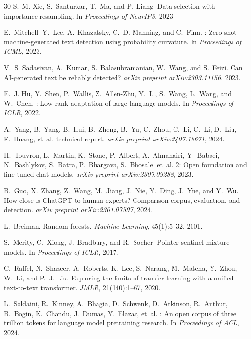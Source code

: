 \documentclass[11pt,a4paper]{article}
\begin{document}
\begin{thebibliography}{30}
S.~M. Xie, S.~Santurkar, T.~Ma, and P.~Liang.
\newblock Data selection with importance resampling.
\newblock In \emph{Proceedings of NeurIPS}, 2023.

E.~Mitchell, Y.~Lee, A.~Khazatsky, C.~D. Manning, and C.~Finn.
: Zero-shot machine-generated text detection using probability curvature.
\newblock In \emph{Proceedings of ICML}, 2023.

V.~S. Sadasivan, A.~Kumar, S.~Balasubramanian, W.~Wang, and S.~Feizi.
\newblock Can {AI}-generated text be reliably detected?
\newblock \emph{arXiv preprint arXiv:2303.11156}, 2023.

E.~J. Hu, Y.~Shen, P.~Wallis, Z.~Allen-Zhu, Y.~Li, S.~Wang, L.~Wang,
  and W.~Chen.
: Low-rank adaptation of large language models.
\newblock In \emph{Proceedings of ICLR}, 2022.

A.~Yang, B.~Yang, B.~Hui, B.~Zheng, B.~Yu, C.~Zhou, C.~Li, C.~Li, D.~Liu,
  F.~Huang, et~al.
 technical report.
\newblock \emph{arXiv preprint arXiv:2407.10671}, 2024.

H.~Touvron, L.~Martin, K.~Stone, P.~Albert, A.~Almahairi, Y.~Babaei,
  N.~Bashlykov, S.~Batra, P.~Bhargava, S.~Bhosale, et~al.
 2: Open foundation and fine-tuned chat models.
\newblock \emph{arXiv preprint arXiv:2307.09288}, 2023.

B.~Guo, X.~Zhang, Z.~Wang, M.~Jiang, J.~Nie, Y.~Ding, J.~Yue, and Y.~Wu.
\newblock How close is {ChatGPT} to human experts? {C}omparison corpus, evaluation, and detection.
\newblock \emph{arXiv preprint arXiv:2301.07597}, 2024.

L.~Breiman.
\newblock Random forests.
\newblock \emph{Machine Learning}, 45(1):5--32, 2001.

S.~Merity, C.~Xiong, J.~Bradbury, and R.~Socher.
\newblock Pointer sentinel mixture models.
\newblock In \emph{Proceedings of ICLR}, 2017.

C.~Raffel, N.~Shazeer, A.~Roberts, K.~Lee, S.~Narang, M.~Matena, Y.~Zhou,
  W.~Li, and P.~J. Liu.
\newblock Exploring the limits of transfer learning with a unified text-to-text transformer.
\newblock \emph{JMLR}, 21(140):1--67, 2020.

L.~Soldaini, R.~Kinney, A.~Bhagia, D.~Schwenk, D.~Atkinson, R.~Authur,
  B.~Bogin, K.~Chandu, J.~Dumas, Y.~Elazar, et~al.
: An open corpus of three trillion tokens for language model pretraining research.
\newblock In \emph{Proceedings of ACL}, 2024.

\end{thebibliography}
\end{document}
